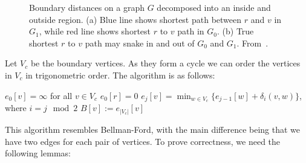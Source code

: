 \documentclass[11pt]{article}
\begin{document}
\begin{figure}[!htb]
  \centering
  \hfil
  \caption{Boundary distances on a graph $G$ decomposed into an inside and outside region. (a) Blue line shows shortest path between $r$ and $v$ in $G_1$, while red line shows shortest $r$ to $v$ path in $G_0$. (b) True shortest $r$ to $v$ path may snake in and out of $G_0$ and $G_1$. From~\cite{klein2010shortest}.}
  \label{fig:long-path}
\end{figure}

Let $V_c$ be the boundary vertices. As they form a cycle we can order the vertices in $V_c$ in trigonometric order. The algorithm is as follows:

\begin{algorithm}[!htb]
  \label{alg: bellman-ford}
  \begin{algorithmic}
    \State $e_0[v] = \infty$ for all $v \in V_c$
    \State $e_0[r] = 0$
        \State $e_j[v] = \min_{w\in V_c} \{e_{j-1}[w] + \delta_i(v,w)\}$, where $i = j \mod 2$
      \EndFor
    \EndFor
      \State $B[v] := e_{|V_c|}[v]$
    \EndFor
  \end{algorithmic}
\end{algorithm}

This algorithm resembles Bellman-Ford, with the main difference being that we have two edges for each pair of vertices. To prove correctness, we need the following lemmas:\\
\end{document}
